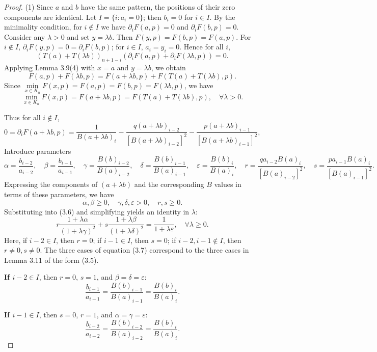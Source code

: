 \documentclass[a4paper,fleqn,numbers]{cas-sc}
\begin{document}
	\begin{proof}
		(1) Since $a$ and $b$ have the same pattern, the positions of their zero components are identical. Let $I = \{ i : a_i = 0 \}$; then $b_i = 0$ for $i \in I$. By the minimality condition, for $i \notin I$ we have $\partial_i F(a,p) = 0$ and $\partial_i F(b,p) = 0$. Consider any $\lambda > 0$ and set $y = \lambda b$. Then $F(y,p) = F(b,p) = F(a,p)$. For $i \notin I$, $\partial_i F(y,p) = 0 = \partial_i F(b,p)$; for $i \in I$, $a_i = y_i = 0$. Hence for all $i$,
		\[
		(T(a) + T(\lambda b))_{n+1-i} (\partial_i F(a,p) + \partial_i F(\lambda b,p)) = 0.
		\]
		Applying Lemma 3.9(4) with $x = a$ and $y = \lambda b$, we obtain
		\[
		F(a,p) + F(\lambda b,p) = F(a+\lambda b,p) + F(T(a)+T(\lambda b),p).
		\]
		Since $\min\limits_{x \in K_n} F(x,p) = F(a,p) = F(b,p) = F(\lambda b,p)$, we have
		\[
		\min_{x \in K_n} F(x,p) = F(a+\lambda b,p) = F(T(a)+T(\lambda b),p), \quad \forall \lambda >0.
		\]
		
		Thus for all $i \notin I$,
		\[
		0 = \partial_i F(a+\lambda b, p) = \frac{1}{B(a+\lambda b)_i} - \frac{q (a+\lambda b)_{i-2}}{[B(a+\lambda b)_{i-2}]^2} - \frac{p (a+\lambda b)_{i-1}}{[B(a+\lambda b)_{i-1}]^2},\tag{3.6}
		\]
		Introduce parameters
		\[
		\alpha = \frac{b_{i-2}}{a_{i-2}}, \quad \beta = \frac{b_{i-1}}{a_{i-1}}, \quad\gamma = \frac{B(b)_{i-2}}{B(a)_{i-2}}, \quad \delta = \frac{B(b)_{i-1}}{B(a)_{i-1}}, \quad \varepsilon = \frac{B(b)_i}{B(a)_i},\quad r = \frac{q a_{i-2} B(a)_i}{[B(a)_{i-2}]^2}, \quad s = \frac{p a_{i-1} B(a)_i}{[B(a)_{i-1}]^2}.
		\]
		Expressing the components of $(a+\lambda b)$ and the corresponding $B$ values in terms of these parameters, we have
		\[
		\alpha,\beta \geq 0,\quad \gamma,\delta,\varepsilon > 0,\quad r,s \geq 0.
		\]
		Substituting into (3.6) and simplifying yields an identity in $\lambda$:
		\[
		r \frac{1 + \lambda \alpha}{(1 + \lambda \gamma)^2} + s \frac{1 + \lambda \beta}{(1 + \lambda \delta)^2} = \frac{1}{1 + \lambda \varepsilon}, \quad \forall \lambda \geq 0. \tag{3.7}
		\]
		Here, if $i-2 \in I$, then $r=0$; if $i-1 \in I$, then $s=0$; if $i-2,i-1 \notin I$, then $r\neq 0, s\neq 0$. The three cases of equation (3.7) correspond to the three cases in Lemma 3.11 of the form (3.5).
		
		\textbf{If $i-2 \in I$}, then $r=0$, $s=1$, and $\beta = \delta = \varepsilon$:
		\[
		\frac{b_{i-1}}{a_{i-1}} = \frac{B(b)_{i-1}}{B(a)_{i-1}} = \frac{B(b)_i}{B(a)_i}.\tag{3.8}
		\]
		
		\textbf{If $i-1 \in I$}, then $s=0$, $r=1$, and $\alpha = \gamma = \varepsilon$:
		\[
		\frac{b_{i-2}}{a_{i-2}} = \frac{B(b)_{i-2}}{B(a)_{i-2}} = \frac{B(b)_i}{B(a)_i}.\tag{3.9}
		\]
		

\end{proof}
\end{document}
